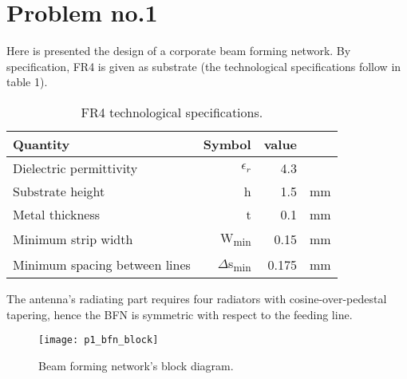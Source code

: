 \section{Problem no.1}

Here is presented the design of a corporate beam forming network. By specification, FR4 is given as substrate (the technological specifications follow in table 1).

 \begin{table} [b]
 	\label{tab:p1_FR4}
 	\caption{FR4 technological specifications.}
 	\centering	
 	\begin{tabular}{lrrr} 
 		\toprule 
 		Quantity & Symbol & value & \\
 		\midrule
		Dielectric permittivity &$\epsilon_{r}$		&4.3		& 		\\
 		Substrate height&	h				& 1.5		&  mm	\\ 
 		Metal thickness&t	& 0.1	& mm\\
 		Minimum strip width &W\textsubscript{min}&0.15 & mm \\
 		Minimum spacing between lines &$\Delta$s\textsubscript{min}&0.175 & mm \\
 		\bottomrule 
 	\end{tabular}	
 \end{table}

The antenna's radiating part requires four radiators with cosine-over-pedestal tapering, hence the BFN is symmetric with respect to the feeding line. 

\begin{figure}[t] 
	\centering
	\texttt{[image: p1\_bfn\_block]}
	\caption{Beam forming network's block diagram.}
	\label{fig:p1_bfn_block}
\end{figure}

